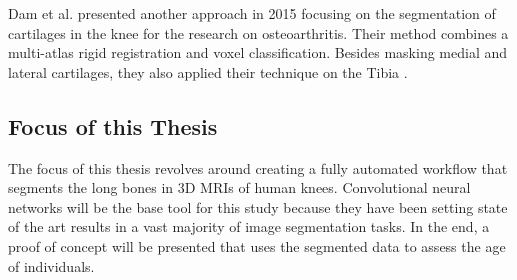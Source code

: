 Dam et al. presented another approach in 2015 focusing on the segmentation of cartilages in the knee for the research on osteoarthritis. Their method combines a multi-atlas rigid registration and voxel classification. Besides masking medial and lateral cartilages, they also applied their technique on the Tibia \cite{Dam}.

\subsection{Focus of this Thesis}

The focus of this thesis revolves around creating a fully automated workflow that segments the long bones in 3D MRIs of human knees. Convolutional neural networks will be the base tool for this study because they have been setting state of the art results in a vast majority of image segmentation tasks. In the end, a proof of concept will be presented that uses the segmented data to assess the age of individuals.

\newpage
